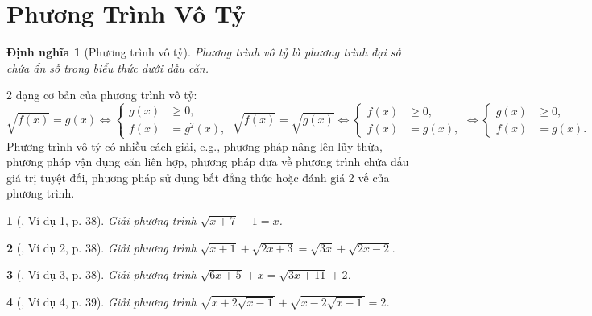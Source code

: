 \documentclass{article}
\newtheorem{baitoan}{}
\newtheorem{dinhnghia}{Định nghĩa}
\begin{document}

\section{Phương Trình Vô Tỷ}

\begin{dinhnghia}[Phương trình vô tỷ]
	{\rm Phương trình vô tỷ} là phương trình đại số chứa ẩn số trong biểu thức dưới dấu căn.
\end{dinhnghia}
2 dạng cơ bản của phương trình vô tỷ:
\begin{equation*}
	\boxed{\sqrt{f(x)} = g(x)\Leftrightarrow\left\{\begin{split}
		g(x)&\ge0,\\
		f(x) &= g^2(x),
	\end{split}\right.\ \sqrt{f(x)} = \sqrt{g(x)}\Leftrightarrow\left\{\begin{split}
	f(x)&\ge0,\\
	f(x) &= g(x),
	\end{split}\right.\Leftrightarrow\left\{\begin{split}
		g(x)&\ge0,\\
		f(x) &= g(x).
	\end{split}\right.}
\end{equation*}
Phương trình vô tỷ có nhiều cách giải, e.g., phương pháp nâng lên lũy thừa, phương pháp vận dụng căn liên hợp, phương pháp đưa về phương trình chứa dấu giá trị tuyệt đối, phương pháp sử dụng bất đẳng thức hoặc đánh giá 2 vế của phương trình.

\begin{baitoan}[\cite{Binh_boi_duong_Toan_9_tap_1}, Ví dụ 1, p. 38]
	Giải phương trình $\sqrt{x + 7} - 1 = x$.
\end{baitoan}

\begin{baitoan}[\cite{Binh_boi_duong_Toan_9_tap_1}, Ví dụ 2, p. 38]
	Giải phương trình $\sqrt{x + 1} + \sqrt{2x + 3} = \sqrt{3x} + \sqrt{2x - 2}$.
\end{baitoan}

\begin{baitoan}[\cite{Binh_boi_duong_Toan_9_tap_1}, Ví dụ 3, p. 38]
	Giải phương trình $\sqrt{6x + 5} + x = \sqrt{3x + 11} + 2$.
\end{baitoan}

\begin{baitoan}[\cite{Binh_boi_duong_Toan_9_tap_1}, Ví dụ 4, p. 39]
	Giải phương trình $\sqrt{x + 2\sqrt{x - 1}} + \sqrt{x - 2\sqrt{x - 1}} = 2$.
\end{baitoan}
\end{document}
